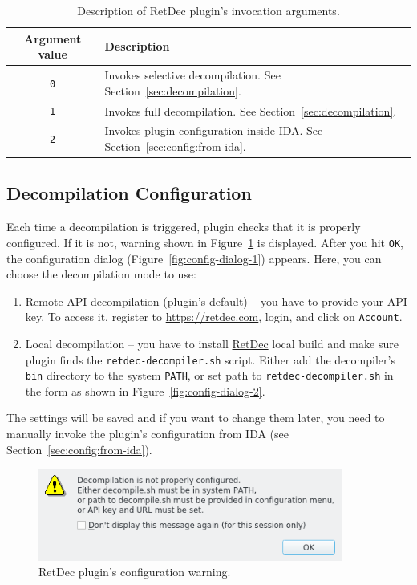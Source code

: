 \documentclass[pdftex, a4paper,12pt, oneside, svgnames]{article}
\begin{document}
\begin{table}[!ht]
\centering
\caption{Description of RetDec plugin's invocation arguments.}
\label{table:plugin-args}
\begin{tabular}{cl}
\textbf{Argument value} & \textbf{Description}\\
\hline
\texttt{0} & Invokes selective decompilation. See Section~\ref{sec:decompilation}. \\
\texttt{1} & Invokes full decompilation. See Section~\ref{sec:decompilation}. \\
\texttt{2} & Invokes plugin configuration inside IDA. See Section~\ref{sec:config:from-ida}.
\end{tabular}
\end{table}

\subsection{Decompilation Configuration}
Each time a decompilation is triggered, plugin checks that it is properly configured. If it is not, warning shown in Figure~\ref{fig:config-warning} is displayed. After you hit \texttt{OK}, the configuration dialog (Figure~\ref{fig:config-dialog-1}) appears. Here, you can choose the decompilation mode to use:
\begin{enumerate}
	\item Remote API decompilation (plugin's default) -- you have to provide your API key. To access it, register to \url{https://retdec.com}, login, and click on \texttt{Account}.
	\item Local decompilation -- you have to install \href{https://github.com/avast-tl/retdec}{RetDec} local build and make sure plugin finds the \texttt{retdec-decompiler.sh} script. Either add the decompiler's \texttt{bin} directory to the system \texttt{PATH}, or set path to \texttt{retdec-decompiler.sh} in the form as shown in Figure~\ref{fig:config-dialog-2}.
\end{enumerate}

The settings will be saved and if you want to change them later, you need to manually invoke the plugin's configuration from IDA (see Section~\ref{sec:config:from-ida}).

\begin{figure}[!ht]
	\centering
	\includegraphics[width=10cm]{figures/config-warning}
	\caption{RetDec plugin's configuration warning.}
	\label{fig:config-warning}
\end{figure}
\end{document}

